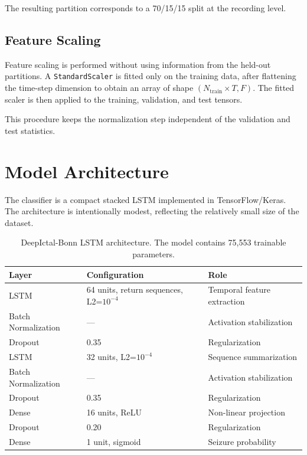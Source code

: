 \documentclass[11pt,a4paper]{article}
\begin{document}
The resulting partition corresponds to a 70/15/15 split at the recording level.

\subsection{Feature Scaling}

Feature scaling is performed without using information from the held-out partitions. A \texttt{StandardScaler} is fitted only on the training data, after flattening the time-step dimension to obtain an array of shape $(N_{\mathrm{train}}\times T,F)$. The fitted scaler is then applied to the training, validation, and test tensors.

This procedure keeps the normalization step independent of the validation and test statistics.

\section{Model Architecture}

The classifier is a compact stacked LSTM implemented in TensorFlow/Keras. The architecture is intentionally modest, reflecting the relatively small size of the dataset.

\begin{table}[H]
\centering
\begin{tabular}{@{}lll@{}}
\toprule
\textbf{Layer} & \textbf{Configuration} & \textbf{Role} \\
\midrule
LSTM & 64 units, return sequences, L2=$10^{-4}$ & Temporal feature extraction \\
Batch Normalization & --- & Activation stabilization \\
Dropout & 0.35 & Regularization \\
LSTM & 32 units, L2=$10^{-4}$ & Sequence summarization \\
Batch Normalization & --- & Activation stabilization \\
Dropout & 0.35 & Regularization \\
Dense & 16 units, ReLU & Non-linear projection \\
Dropout & 0.20 & Regularization \\
Dense & 1 unit, sigmoid & Seizure probability \\
\bottomrule
\end{tabular}
\caption{DeepIctal-Bonn LSTM architecture. The model contains 75,553 trainable parameters.}
\end{table}
\end{document}
